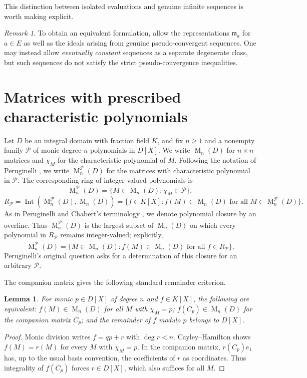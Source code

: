 \documentclass[11pt]{amsart}
\newtheorem{lemma}[theorem]{Lemma}
\theoremstyle{definition}
\theoremstyle{remark}
\newtheorem{remark}[theorem]{Remark}
\newcommand{\Int}{\operatorname{Int}}
\newcommand{\Mat}{\operatorname{M}}
\newcommand{\m}{\mathfrak m}
\begin{document}
This distinction between isolated evaluations and genuine infinite sequences is worth making explicit.
\begin{remark}
To obtain an equivalent formulation, allow the representations $\m_a$ for $a\in E$ as well as the ideals arising from genuine pseudo-convergent sequences. One may instead allow \emph{eventually constant} sequences as a separate degenerate class, but such sequences do not satisfy the strict pseudo-convergence inequalities. 
\end{remark}

\section{Matrices with prescribed characteristic polynomials}
Let $D$ be an integral domain with fraction field $K$, and fix
$n\ge1$ and a nonempty family $\mathcal P$ of monic degree-$n$
polynomials in $D[X]$. We write $\Mat_n(D)$ for $n\times n$ matrices
and $\chi_M$ for the characteristic polynomial of $M$.
Following the notation of Peruginelli \cite[\S6]{Peruginelli2014},
we write $\Mat_n^{\mathcal P}(D)$ for the matrices with
characteristic polynomial in $\mathcal P$. The corresponding
ring of integer-valued polynomials is
\[
\Mat_n^{\mathcal P}(D)=\{M\in\Mat_n(D):\chi_M\in\mathcal P\},
\]
\[
 R_{\mathcal P}=\Int(\Mat_n^{\mathcal P}(D),\Mat_n(D))
=\{f\in K[X]:f(M)\in\Mat_n(D)
\text{ for all }M\in\Mat_n^{\mathcal P}(D)\}.
\]
As in Peruginelli \cite{Peruginelli2014} and Chabert's terminology
\cite[Definition~VII.1]{Chabert2025}, we denote polynomial closure
by an overline. Thus $\overline{\Mat_n^{\mathcal P}(D)}$
is the largest subset of $\Mat_n(D)$ on which every polynomial in
$R_{\mathcal P}$ remains integer-valued; explicitly,
\[
\overline{\Mat_n^{\mathcal P}(D)}=\{M\in\Mat_n(D):
f(M)\in\Mat_n(D)\text{ for all }f\in R_{\mathcal P}\}.
\]
Peruginelli's original question \cite[\S6]{Peruginelli2014} asks for
a determination of this closure for an arbitrary $\mathcal P$.


The companion matrix gives the following standard remainder criterion.
\begin{lemma}\label{lem:companion}
For monic $p\in D[X]$ of degree $n$ and $f\in K[X]$, the
following are equivalent: $f(M)\in\Mat_n(D)$ for all $M$ with
$\chi_M=p$; $f(C_p)\in\Mat_n(D)$ for the companion matrix $C_p$;
and the remainder of $f$ modulo $p$ belongs to $D[X]$.
\end{lemma}
\begin{proof}
Monic division writes $f=qp+r$ with $\deg r<n$.
Cayley--Hamilton shows $f(M)=r(M)$ for every $M$ with
$\chi_M=p$. In the companion matrix, $r(C_p)e_1$ has,
up to the usual basis convention, the coefficients of $r$ as
coordinates. Thus integrality of $f(C_p)$ forces $r\in D[X]$,
which also suffices for all $M$.
\end{proof}
\end{document}
